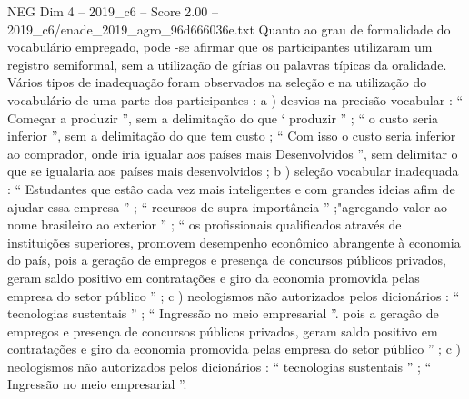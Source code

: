 \begin{textsample}{NEG Dim 4 – 2019\_c6 – Score 2.00 – 2019\_c6/enade\_2019\_agro\_96d666036e.txt}
Quanto ao grau de formalidade do vocabulário empregado, pode -se afirmar que os participantes utilizaram um registro semiformal, sem a utilização de gírias ou palavras típicas da oralidade.
Vários tipos de inadequação foram observados na seleção e na utilização do vocabulário de uma parte dos participantes : a ) desvios na precisão vocabular : “ Começar a produzir ”, sem a delimitação do que ‘ produzir ” ; “ o custo seria inferior ”, sem a delimitação do que tem custo ; “ Com isso o custo seria inferior ao comprador, onde iria igualar aos países mais Desenvolvidos ”, sem delimitar o que se igualaria aos países mais desenvolvidos ; b ) seleção vocabular inadequada : “ Estudantes que estão cada vez mais inteligentes e com grandes ideias afim de ajudar essa empresa ” ; “ recursos de supra importância ” ;"agregando valor ao nome brasileiro ao exterior ” ; “ os profissionais qualificados através de instituições superiores, promovem desempenho econômico abrangente à economia do país, pois a geração de empregos e presença de concursos públicos privados, geram saldo positivo em contratações e giro da economia promovida pelas empresa do setor público ” ; c ) neologismos não autorizados pelos dicionários : “ tecnologias sustentais ” ; “ Ingressão no meio empresarial ”. pois a geração de empregos e presença de concursos públicos privados, geram saldo positivo em contratações e giro da economia promovida pelas empresa do setor público ” ; c ) neologismos não autorizados pelos dicionários : “ tecnologias sustentais ” ; “ Ingressão no meio empresarial ”.

\end{textsample}
